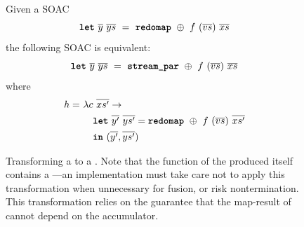 \begin{figure}[bt]
  Given a SOAC
\[
  \mbox{\texttt{\bfseries{let}}}~\overline{y}~\overline{ys}~=~\mbox{\texttt{\bfseries{redomap}}}~\oplus~f~(\overline{vs})~\overline{xs}
\]
the following SOAC is equivalent:
\[
  \mbox{\texttt{\bfseries{let}}}~\overline{y}~\overline{ys}~=~\mbox{\texttt{\bfseries{stream\_par}}}~\oplus~f~(\overline{vs})~\overline{xs}
\]
where \begin{align*}
        h =~& \lambda c~\overline{xs'} \rightarrow \\
            & \quad \mbox{\texttt{\bfseries{let}}}~\overline{y'}~\overline{ys'} = \mbox{\texttt{\bfseries{redomap}}}~\oplus~f~(\overline{vs})~\overline{xs'} \\
            & \quad \mbox{\texttt{\bfseries{in}}}~(\overline{y'}, \overline{ys'})
  \end{align*}
  \caption{Transforming a  to a \StreamPar.  Note that the
    function of the produced \StreamPar itself contains a
    ---an implementation must take care not to apply this
    transformation when unnecessary for fusion, or risk
    nontermination.  This transformation relies on the guarantee that
    the map-result of  cannot depend on the accumulator.}
  \label{fig:redomap-to-streamred}
\end{figure}


